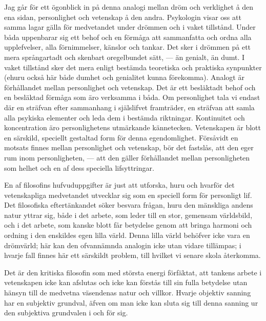 \documentclass[12pt]{article}
\newcommand{\opage}[1]{\marginnote{\footnotesize\textit{[#1]}}}
\begin{document}
Jag går för ett ögonblick in på denna analogi mellan dröm och verklighet å den ena sidan, personlighet och vetenskap å den andra. Psykologin visar oss att samma lagar gälla för medvetandet under drömmen och i vaket tillstånd. Under båda uppenbarar sig ett behof och en förmåga att sammanfatta och ordna alla upplefvelser, alla förnimmelser, känslor och tankar. Det sker i drömmen på ett mera språngartadt och skenbart oregelbundet sätt, --- än genialt, än dumt. I vaket tillstånd sker det mera enligt %
\opage{9}
bestämda teoretiska och praktiska synpunkter (ehuru också här både dumhet och genialitet kunna förekomma). Analogt är förhållandet mellan personlighet och vetenskap. Det är ett besläktadt behof och en besläktad förmåga som äro verksamma i båda. Om personlighet tala vi endast där en sträfvan efter sammanhang i själslifvet framträder, en sträfvan att samla alla psykiska elementer och leda dem i bestämda riktningar. Kontinuitet och koncentration äro personlighetens utmärkande kännetecken. Vetenskapen är blott en särskild, speciellt gestaltad form för denna egendomlighet. Försåvidt en motsats finnes mellan personlighet och vetenskap, bör det fastslås, att den eger rum inom personligheten, --- att den gäller förhållandet mellan personligheten som helhet och en af dess speciella lifsyttringar.

En af filosofins hufvuduppgifter är just att utforska, huru och hvarför det vetenskapliga medvetandet utvecklar sig som en speciell form för personligt lif. Det filosofiska eftertänkandet söker besvara frågan, huru den mänskliga andens natur yttrar sig, både i det arbete, som leder till en stor, gemensam världsbild, %
\opage{10}
och i det arbete, som kanske blott får betydelse genom att bringa harmoni och ordning i den enskildes egen lilla värld. Denna lilla värld behöfver icke vara en drömvärld; här kan den ofvannämnda analogin icke utan vidare tillämpas; i hvarje fall finnes här ett särskildt problem, till hvilket vi senare skola återkomma.

Det är den kritiska filosofin som med största energi förfäktat, att tankens arbete i vetenskapen icke kan afslutas och icke kan förstås till sin fulla betydelse utan hänsyn till de medvetna väsendenas natur och villkor. Hvarje objektiv sanning har en subjektiv grundval, äfven om man icke kan sluta sig till denna sanning ur den subjektiva grundvalen i och för sig.
\end{document}
